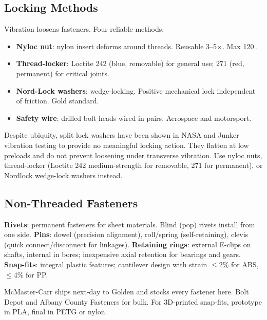 \subsection{Locking Methods}
Vibration loosens fasteners. Four reliable methods:
\begin{itemize}[nosep,leftmargin=1.5em]
\item \textbf{Nyloc nut}: nylon insert deforms around threads. Reusable 3--5$\times$. Max 120\,\degC{}.
\item \textbf{Thread-locker}: Loctite 242 (blue, removable) for general use; 271 (red, permanent) for critical joints.
\item \textbf{Nord-Lock washers}: wedge-locking. Positive mechanical lock independent of friction. Gold standard.
\item \textbf{Safety wire}: drilled bolt heads wired in pairs. Aerospace and motorsport.
\end{itemize}

\begin{warningbox}
Despite ubiquity, split lock washers have been shown in NASA and Junker vibration testing to provide no meaningful locking action. They flatten at low preloads and do not prevent loosening under transverse vibration. Use nyloc nuts, thread-locker (Loctite 242 medium-strength for removable, 271 for permanent), or Nordlock wedge-lock washers instead.
\end{warningbox}

\subsection{Non-Threaded Fasteners}
\textbf{Rivets}: permanent fasteners for sheet materials. Blind (pop) rivets install from one side. \textbf{Pins}: dowel (precision alignment), roll/spring (self-retaining), clevis (quick connect/disconnect for linkages). \textbf{Retaining rings}: external E-clips on shafts, internal in bores; inexpensive axial retention for bearings and gears. \textbf{Snap-fits}: integral plastic features; cantilever design with strain $\leq$2\% for ABS, $\leq$4\% for PP.

\begin{tipbox}
McMaster-Carr ships next-day to Golden and stocks every fastener here. Bolt Depot and Albany County Fasteners for bulk. For 3D-printed snap-fits, prototype in PLA, final in PETG or nylon.
\end{tipbox}

